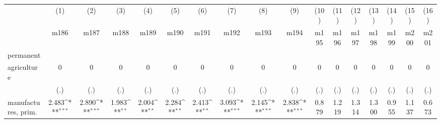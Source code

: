 {
\def\sym#1{\ifmmode^{#1}\else\(^{#1}\)\fi}
\begin{tabular}{l*{16}{c}}
\hline\hline
                    &\multicolumn{1}{c}{(1)}&\multicolumn{1}{c}{(2)}&\multicolumn{1}{c}{(3)}&\multicolumn{1}{c}{(4)}&\multicolumn{1}{c}{(5)}&\multicolumn{1}{c}{(6)}&\multicolumn{1}{c}{(7)}&\multicolumn{1}{c}{(8)}&\multicolumn{1}{c}{(9)}&\multicolumn{1}{c}{(10)}&\multicolumn{1}{c}{(11)}&\multicolumn{1}{c}{(12)}&\multicolumn{1}{c}{(13)}&\multicolumn{1}{c}{(14)}&\multicolumn{1}{c}{(15)}&\multicolumn{1}{c}{(16)}\\
                    &\multicolumn{1}{c}{m186}&\multicolumn{1}{c}{m187}&\multicolumn{1}{c}{m188}&\multicolumn{1}{c}{m189}&\multicolumn{1}{c}{m190}&\multicolumn{1}{c}{m191}&\multicolumn{1}{c}{m192}&\multicolumn{1}{c}{m193}&\multicolumn{1}{c}{m194}&\multicolumn{1}{c}{m195}&\multicolumn{1}{c}{m196}&\multicolumn{1}{c}{m197}&\multicolumn{1}{c}{m198}&\multicolumn{1}{c}{m199}&\multicolumn{1}{c}{m200}&\multicolumn{1}{c}{m201}\\
\hline
permanent           &                     &                     &                     &                     &                     &                     &                     &                     &                     &                     &                     &                     &                     &                     &                     &                     \\
agriculture         &           0         &           0         &           0         &           0         &           0         &           0         &           0         &           0         &           0         &           0         &           0         &           0         &           0         &           0         &           0         &           0         \\
                    &         (.)         &         (.)         &         (.)         &         (.)         &         (.)         &         (.)         &         (.)         &         (.)         &         (.)         &         (.)         &         (.)         &         (.)         &         (.)         &         (.)         &         (.)         &         (.)         \\
[1em]
manufactures, prim. &       2.483\sym{***}&       2.890\sym{***}&       1.983\sym{**} &       2.004\sym{**} &       2.284\sym{**} &       2.413\sym{**} &       3.093\sym{***}&       2.145\sym{***}&       2.838\sym{***}&       0.879         &       1.219         &       1.314         &       1.300         &       0.955         &       1.137         &       0.673         \\

\end{tabular}}
